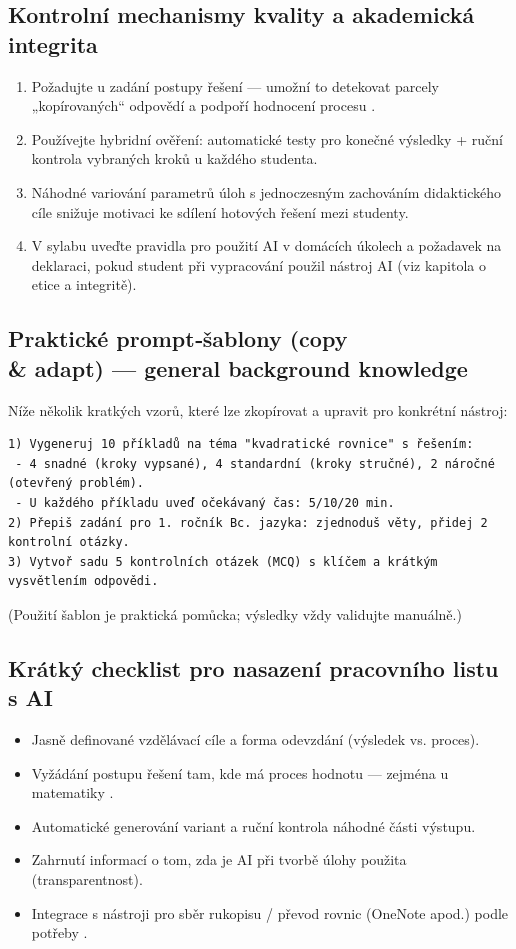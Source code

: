 \documentclass{report}%
\begin{document}
\subsection*{Kontrolní mechanismy kvality a akademická integrita}
\begin{enumerate}
  \item Požadujte u zadání postupy řešení — umožní to detekovat parcely „kopírovaných“ odpovědí a podpoří hodnocení procesu \cite{kb_ai_101_tipu_pdf_04e4a115_page_8_1}.
  \item Používejte hybridní ověření: automatické testy pro konečné výsledky + ruční kontrola vybraných kroků u každého studenta.
  \item Náhodné variování parametrů úloh s jednoczesným zachováním didaktického cíle snižuje motivaci ke sdílení hotových řešení mezi studenty.
  \item V sylabu uveďte pravidla pro použití AI v domácích úkolech a požadavek na deklaraci, pokud student při vypracování použil nástroj AI (viz kapitola o etice a integritě).
\end{enumerate}

\subsection*{Praktické prompt‑šablony (copy \\ \& adapt) — general background knowledge}
Níže několik kratkých vzorů, které lze zkopírovat a upravit pro konkrétní nástroj:
\begin{verbatim}
1) Vygeneruj 10 příkladů na téma "kvadratické rovnice" s řešením:
 - 4 snadné (kroky vypsané), 4 standardní (kroky stručné), 2 náročné (otevřený problém).
 - U každého příkladu uveď očekávaný čas: 5/10/20 min.
2) Přepiš zadání pro 1. ročník Bc. jazyka: zjednoduš věty, přidej 2 kontrolní otázky.
3) Vytvoř sadu 5 kontrolních otázek (MCQ) s klíčem a krátkým vysvětlením odpovědi.
\end{verbatim}
(Použití šablon je praktická pomůcka; výsledky vždy validujte manuálně.)

\subsection*{Krátký checklist pro nasazení pracovního listu s AI}
\begin{itemize}
  \item Jasně definované vzdělávací cíle a forma odevzdání (výsledek vs. proces).
  \item Vyžádání postupu řešení tam, kde má proces hodnotu — zejména u matematiky \cite{kb_ai_101_tipu_pdf_04e4a115_page_8_1}.
  \item Automatické generování variant a ruční kontrola náhodné části výstupu.
  \item Zahrnutí informací o tom, zda je AI při tvorbě úlohy použita (transparentnost).
  \item Integrace s nástroji pro sběr rukopisu / převod rovnic (OneNote apod.) podle potřeby \cite{kb_ai_101_tipu_pdf_04e4a115_page_8_1}.
\end{itemize}
\end{document}
